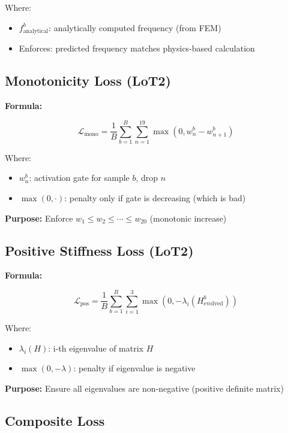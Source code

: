 \documentclass[11pt,a4paper]{article}
\begin{document}
Where:
\begin{itemize}
  \item $f_{\text{analytical}}^b$: analytically computed frequency (from FEM)
  \item Enforces: predicted frequency matches physics-based calculation
\end{itemize}

\subsection{Monotonicity Loss (LoT2)}

\textbf{Formula:}

\begin{equation}
\mathcal{L}_{\text{mono}} = \frac{1}{B}\sum_{b=1}^{B} \sum_{n=1}^{19} \max(0, w_n^b - w_{n+1}^b)
\end{equation}

Where:
\begin{itemize}
  \item $w_n^b$: activation gate for sample $b$, drop $n$
  \item $\max(0, \cdot)$: penalty only if gate is decreasing (which is bad)
\end{itemize}

\textbf{Purpose:} Enforce $w_1 \leq w_2 \leq \cdots \leq w_{20}$ (monotonic increase)

\subsection{Positive Stiffness Loss (LoT2)}

\textbf{Formula:}

\begin{equation}
\mathcal{L}_{\text{pos}} = \frac{1}{B}\sum_{b=1}^{B} \sum_{i=1}^{3} \max(0, -\lambda_i(H_{\text{evolved}}^b))
\end{equation}

Where:
\begin{itemize}
  \item $\lambda_i(H)$: i-th eigenvalue of matrix $H$
  \item $\max(0, -\lambda)$: penalty if eigenvalue is negative
\end{itemize}

\textbf{Purpose:} Ensure all eigenvalues are non-negative (positive definite matrix)

\subsection{Composite Loss}
\end{document}
